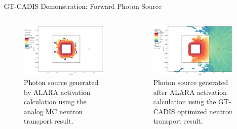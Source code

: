\documentclass{beamer}
\begin{document}
\begin{frame}{GT-CADIS Demonstration: Forward Photon Source}
	\begin{columns}
\begin{figure} 
	\includegraphics[scale=0.15]{analog_p_src_g1.png}
	\caption [Analog photon source]
	{Photon source generated by ALARA activation calculation using the
	 analog MC neutron transport result.\label{fig:ex.analog_psrc}}
\end{figure}

\begin{figure} 
	\includegraphics[scale=0.15]{gtcadis_photon_src_g1.png}
	\caption [GT-CADIS photon source]
	{Photon source generated after ALARA activation calculation using the
	GT-CADIS optimized neutron transport result.\label{fig:ex.gt_psrc}}
\end{figure}
	\end{columns}
\end{frame}
\end{document}
